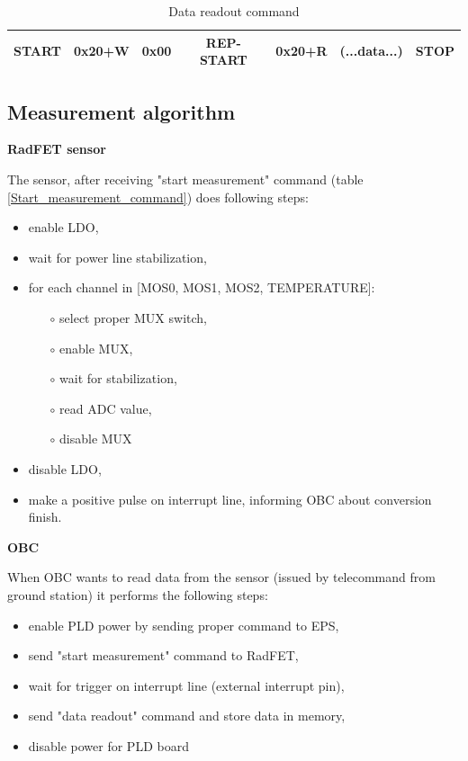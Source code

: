     \begin{table}[H]
        \begin{center}
            \begin{tabular}{|c|c|c|c|c|c|c|}
                \hline
                START & 0x20+W & 0x00 & REP-START & 0x20+R & (...data...) & STOP \\ \hline
            \end{tabular}
        \end{center}
        \caption{Data readout command}
        \label{Data_readout_command}
    \end{table}

    \subsection{Measurement algorithm}
    \bigskip \textbf{RadFET sensor}

    The sensor, after receiving "start measurement" command (table \ref{Start_measurement_command}) does following steps:
    \begin{itemize}
        \item enable LDO,
        \item wait for power line stabilization,
        \item for each channel in [MOS0, MOS1, MOS2, TEMPERATURE]:
        \begin{itemize}
            \item[$\circ$] select proper MUX switch,
            \item[$\circ$] enable MUX,
            \item[$\circ$] wait for stabilization,
            \item[$\circ$] read ADC value,
            \item[$\circ$] disable MUX
        \end{itemize}
        \item disable LDO,
        \item make a positive pulse on interrupt line, informing OBC about conversion finish.
    \end{itemize}

    \bigskip \textbf{OBC}

    When OBC wants to read data from the sensor (issued by telecommand from ground station) it performs the following steps:
    \begin{itemize}
        \item enable PLD power by sending proper command to EPS,
        \item send "start measurement" command to RadFET,
        \item wait for trigger on interrupt line (external interrupt pin),
        \item send "data readout" command and store data in memory,
        \item disable power for PLD board
    \end{itemize}

